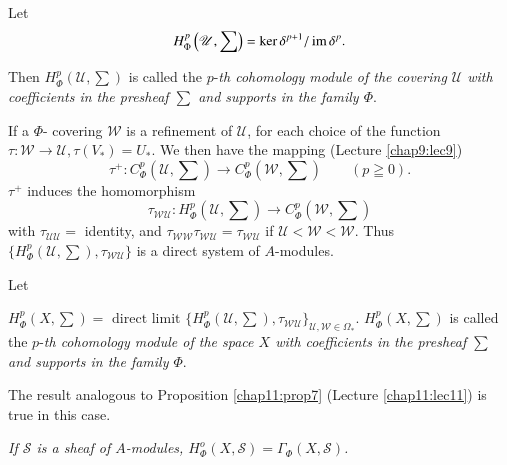 Let\pageoriginale
$$
H^p_{\Phi}\left(\mathscr{U},\sum\right)= \ker \delta^{p+1}/\operatorname{im} \delta^p. 
$$

Then $H^p_{\Phi}\left(\mathscr{U},\sum \right)$ is called the $p$-\textit{th
  cohomology module of the covering $\mathscr{U}$ with coefficients in
  the presheaf $\sum$ and supports in the family $\Phi$}. 

If a $\Phi$- covering $\mathscr{W}$ is a refinement of $\mathscr{U}$,
for each choice of the function $\tau : \mathscr{W} \to \mathscr{U},
\tau (V_*) =U_*$. We then have the mapping (Lecture \ref{chap9:lec9}) 
$$
\tau^+ : C^p_{\Phi} \left(\mathscr{U},\sum \right) \to 
C^p_{\Phi}\left(\mathscr{W},\sum \right) \qquad (p \geqq 0). 
$$
$\tau^+$ induces the homomorphism  
$$
 \tau_{\mathscr{W} \mathscr{U}}:  H^p_{\Phi}\left(\mathscr{U},\sum \right) \to
C^p_{\Phi} \left(\mathscr{W},\sum \right)  
$$
with $\tau_{\mathscr{U} \mathscr{U}}=$ identity, and
$\tau_{\mathscr{W} \mathscr{W}} \tau_{\mathscr{W} \mathscr{U}}=
\tau_{\mathscr{W} \mathscr{U}}$ if $\mathscr{U} < \mathscr{W} <
\mathscr{W}$. Thus $\{ H^p_{\Phi} \left(\mathscr{U},\sum \right),
\tau_{\mathscr{W} \mathscr{U}}\}$ is a direct system of $A$-modules. 

Let 

$H^p_{\Phi}\left(X,\sum \right)= \text{ direct limit }\bigg\{
H^p_{\Phi}\left(\mathscr{U},\sum \right), \tau_{\mathscr{W}
  \mathscr{U}}\bigg\}_{\mathscr{U}, \mathscr{W} \in \Omega_\ast}.
$ $H^p_{\Phi}(X,\sum)$ is called the $p$-\textit{th cohomology module of
  the space $X$ with coefficients in the presheaf $\sum$ and supports
  in the family $\Phi$}. 

The result analogous to Proposition \ref{chap11:prop7} (Lecture
\ref{chap11:lec11}) is 
true in this 
case. 

\medskip
{}
\textit{If $\mathscr{S}$ is a sheaf of $A$-modules, $H^o_{\Phi}(X,
   \mathscr{S})= \Gamma_{\Phi}(X, \mathscr{S})$.}

